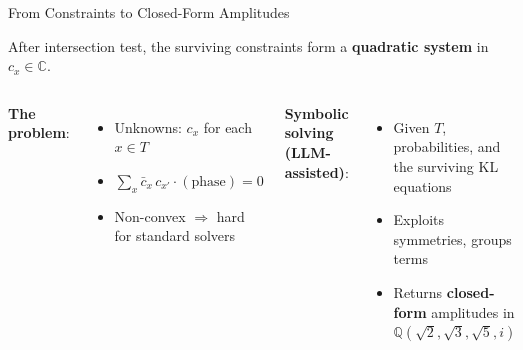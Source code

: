 \documentclass[aspectratio=169,t,10pt]{beamer}
\newcommand{\QQ}{\mathbb{Q}}
\newcommand{\CC}{\mathbb{C}}
\newcommand{\code}[1]{\texttt{\small #1}}
\begin{document}
\begin{frame}{From Constraints to Closed-Form Amplitudes}

After intersection test, the surviving constraints form a
\textbf{quadratic system} in $c_x \in \CC$.

\begin{columns}[T]
\textbf{The problem}:
\begin{itemize}\setlength\itemsep{0pt}
\item Unknowns: $c_x$ for each $x \in T$
\item $\sum_{x} \bar{c}_x\, c_{x'}\!\cdot\!(\text{phase}) = 0$
\item Non-convex $\Rightarrow$ hard for standard solvers
\end{itemize}

\textbf{Symbolic solving (LLM-assisted)}:
\begin{itemize}\setlength\itemsep{0pt}
\item Given $T$, probabilities, and the surviving KL equations
\item Exploits symmetries, groups terms
\item Returns \textbf{closed-form} amplitudes
  in $\QQ(\sqrt{2},\sqrt{3},\sqrt{5},i)$
\end{itemize}
\end{columns}

\vspace{0.2em}
\begin{center}
\end{center}
\end{frame}
\end{document}
